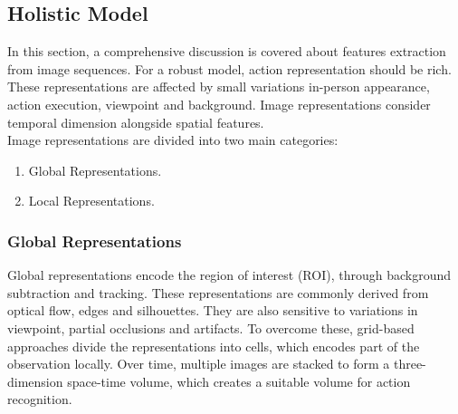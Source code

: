 \subsection{Holistic Model}
\hspace{5mm} In this section, a comprehensive discussion is covered about features extraction from image sequences. For a robust model, action representation should be rich. These representations are affected by small variations in-person appearance, action execution, viewpoint and background. Image representations consider temporal dimension alongside spatial features.\\
\hspace{5mm} Image representations are divided into two main categories:\\
\begin{enumerate}
\item Global Representations.
\item Local Representations.
\end{enumerate}

\subsubsection{Global Representations}
\hspace{5mm} Global representations encode the region of interest (ROI), through background subtraction and tracking. These representations are commonly derived from optical flow, edges and silhouettes. They are also sensitive to variations in viewpoint, partial occlusions and artifacts. To overcome these, grid-based approaches divide the representations into cells, which encodes part of the observation locally. Over time, multiple images are stacked to form a three-dimension space-time volume, which creates a suitable volume for action recognition.\\ 

